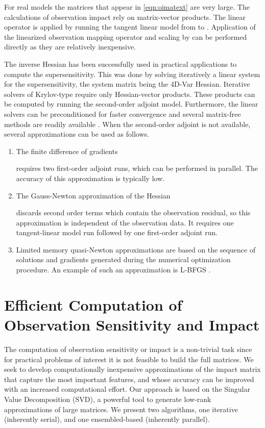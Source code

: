 \documentclass[final,sort&compress]{elsarticle}
\begin{document}
For real models the matrices that appear in \eqref{eqn:oimatext} are very large. 
The calculations of observation impact rely on matrix-vector products. 
The linear operator  is applied by running the tangent linear model from  to . 
Application of the linearized observation mapping operator  and scaling by 
 can be performed directly as they are relatively inexpensive.

The inverse Hessian has been successfully used in practical applications to compute the supersensitivity.
This was done by solving iteratively a linear system for the supersensitivity, the system matrix being the 4D-Var Hessian.
Iterative solvers of Krylov-type require only Hessian-vector products. 
These products can be computed by running the second-order adjoint model.
Furthermore, the linear solvers can be preconditioned for faster convergence and several matrix-free methods are readily available \cite{Cioaca_2012}.
When the second-order adjoint is not available, several approximations can be used as follows.

\begin{enumerate}

\item The finite difference of gradients

requires two first-order adjoint runs, which can be performed in parallel. The accuracy of this approximation is typically low.
 
\item The Gauss-Newton approximation of the Hessian
 

discards second order terms which contain the observation residual, so this approximation is independent of the observation data. It requires one tangent-linear model run 
followed by one first-order adjoint run.
 
\item Limited memory quasi-Newton approximations are based on the sequence of solutions and gradients generated during the numerical optimization procedure.
An example of such an approximation is L-BFGS \cite{zhu1997algorithm}.
  
\end{enumerate}

\section{Efficient Computation of Observation Sensitivity and Impact}\label{sec:lowrank}


The computation of observation sensitivity or impact is a non-trivial task since for practical problems 
of interest it is not feasible to build the full matrices.
We seek to develop computationally inexpensive approximations of the impact matrix that capture 
the most important features, and whose accuracy can be improved with an increased computational effort. 
Our approach is based on the Singular Value Decomposition (SVD), a powerful tool to generate low-rank approximations of large matrices.
We present two algorithms, one iterative (inherently serial), and one ensembled-based (inherently parallel).
\end{document}
